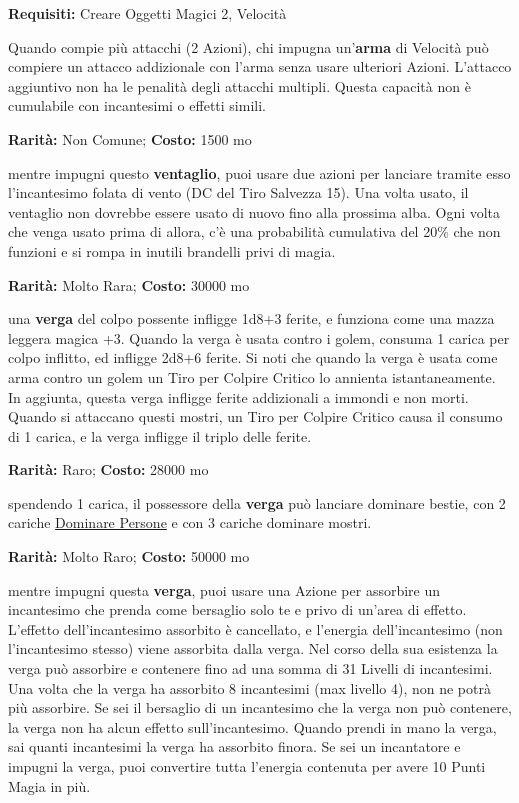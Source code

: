\begin{multicols}{2}
\textbf{Requisiti:} Creare Oggetti Magici 2, Velocità

Quando compie più attacchi (2 Azioni), chi impugna un'\textbf{arma} di Velocità può compiere un attacco addizionale con l'arma senza usare ulteriori Azioni. L'attacco aggiuntivo non ha le penalità degli attacchi multipli. Questa capacità non è cumulabile con incantesimi o effetti simili.


\textbf{Rarità:} Non Comune; \textbf{Costo:} 1500 mo

mentre impugni questo \textbf{ventaglio}, puoi usare due azioni per lanciare tramite esso l'incantesimo folata di vento (DC del Tiro Salvezza 15). Una volta usato, il ventaglio
non dovrebbe essere usato di nuovo fino alla prossima alba. Ogni volta che venga usato prima di allora, c'è una probabilità cumulativa del 20\% che non funzioni e si rompa in inutili brandelli privi di magia.


\textbf{Rarità:} Molto Rara; \textbf{Costo:} 30000 mo

una \textbf{verga} del colpo possente infligge 1d8+3 ferite, e funziona come una mazza leggera magica +3. Quando la verga è usata contro i golem, consuma 1 carica per colpo inflitto, ed infligge 2d8+6 ferite. Si noti che quando la verga è usata come arma contro un golem un Tiro per Colpire Critico lo annienta istantaneamente. In aggiunta, questa verga infligge ferite addizionali a immondi e non morti. Quando si attaccano questi mostri, un Tiro per Colpire Critico causa il consumo di 1 carica, e la verga infligge il triplo delle ferite.


\textbf{Rarità:} Raro; \textbf{Costo:} 28000 mo

spendendo 1 carica, il possessore della \textbf{verga} può lanciare dominare bestie, con 2 cariche \hyperlink{Dominare Persone}{Dominare Persone} e con 3 cariche dominare mostri.


\textbf{Rarità:} Molto Raro; \textbf{Costo:} 50000 mo

mentre impugni questa \textbf{verga}, puoi usare una Azione per assorbire un incantesimo che prenda come bersaglio solo te e privo di un'area di effetto. L'effetto dell'incantesimo assorbito è cancellato, e l'energia dell'incantesimo (non l'incantesimo stesso) viene assorbita dalla verga. Nel corso della sua esistenza la verga può assorbire e contenere fino ad una somma di 31 Livelli di incantesimi. Una volta che la verga ha assorbito 8 incantesimi (max livello 4), non ne potrà più assorbire. Se sei il bersaglio di un incantesimo che la verga non può contenere, la verga non ha alcun effetto sull'incantesimo. Quando prendi in mano la verga, sai quanti incantesimi la verga ha assorbito finora. Se sei un incantatore e impugni la verga, puoi convertire tutta l'energia contenuta per avere 10 Punti Magia in più.


\end{multicols}
